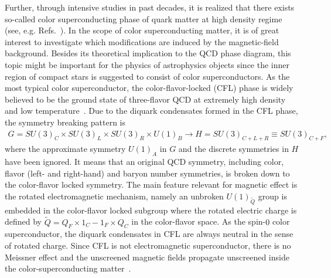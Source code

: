 \documentclass[prd, showpacs,nofootinbib,amsmath,amssymb]{revtex4}
\begin{document}
Further, through intensive studies in past decades, it is realized that there exists so-called color
superconducting phase of quark matter at high density regime (see, e.g.
Refs.~\cite{alford2004dense,buballa2005njl}). In the scope of color superconducting matter, it is of
great interest to investigate which modifications are induced by the magnetic-field background.
Besides its theoretical implication to the QCD phase diagram, this topic might be important for the physics of astrophysics objects since the inner region of compact stars is suggested to consist of color superconductors.
As the most typical color superconductor, the color-flavor-locked (CFL) phase is widely believed to be
the ground state of three-flavor QCD at extremely high density and low temperature~\cite{alford1998qcd}. Due to the
diquark condensates formed in the CFL phase, the symmetry breaking pattern is
\begin{eqnarray}
G=SU(3)_{C}\times SU(3)_{L}
\times SU(3)_{R}\times U(1)_{B} \rightarrow H=SU(3)_{C+L+R}\equiv SU(3)_{C+F},\label{cfl}
\end{eqnarray}
where the approximate symmetry $U(1)_{A}$ in $G$ and the discrete symmetries in $H$ have been ignored.
It means that an original QCD symmetry, including color, flavor (left- and right-hand) and baryon number
symmetries, is broken down to the color-flavor locked symmetry.
The main feature relevant for magnetic effect is the rotated electromagnetic mechanism, namely an unbroken
$U(1)_{\widetilde{Q}}$ group is embedded in the color-flavor locked subgroup where the rotated electric
charge is defined by $\widetilde{Q}=Q_{F}\times {1}_{C}-{1}_{F}\times Q_{C}$ in the color-flavor space.
As the spin-$0$ color superconductor, the diquark condensates in CFL are always neutral in the sense of
rotated charge.
Since CFL is not electromagnetic superconductor, there is no Meissner effect and the unscreened magnetic
fields propagate unscreened inside the color-superconducting matter~\cite{alford1998qcd,alford2000magnetic}.
\end{document}
